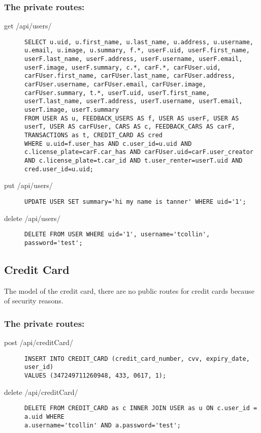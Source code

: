 \documentclass{article}
\begin{document}
\subsubsection{The private routes:}
\begin{description}
\item[get /api/users/] \mbox{}
\begin{lstlisting}[style=sql]
SELECT u.uid, u.first_name, u.last_name, u.address, u.username, u.email, u.image, u.summary, f.*, userF.uid, userF.first_name, userF.last_name, userF.address, userF.username, userF.email, userF.image, userF.summary, c.*, carF.*, carFUser.uid, carFUser.first_name, carFUser.last_name, carFUser.address, carFUser.username, carFUser.email, carFUser.image, carFUser.summary, t.*, userT.uid, userT.first_name, userT.last_name, userT.address, userT.username, userT.email, userT.image, userT.summary
FROM USER AS u, FEEDBACK_USERS AS f, USER AS userF, USER AS userT, USER AS carFUser, CARS AS c, FEEDBACK_CARS AS carF, TRANSACTIONS as t, CREDIT_CARD AS cred
WHERE u.uid=f.user_has AND c.user_id=u.uid AND c.license_plate=carF.car_has AND carFUser.uid=carF.user_creator AND c.license_plate=t.car_id AND t.user_renter=userT.uid AND cred.user_id=u.uid;
\end{lstlisting}

\item[put /api/users/] \mbox{}
\begin{lstlisting}[style=sql]
UPDATE USER SET summary='hi my name is tanner' WHERE uid='1';
\end{lstlisting}

\item[delete /api/users/] \mbox{}
\begin{lstlisting}[style=sql]
DELETE FROM USER WHERE uid='1', username='tcollin', password='test';
\end{lstlisting}
\end{description}

\subsection{Credit Card}
The model of the credit card, there are no public routes for credit cards because of security reasons.

\subsubsection{The private routes:}
\begin{description}
\item[post /api/creditCard/] \mbox{}
\begin{lstlisting}[style=sql]
INSERT INTO CREDIT_CARD (credit_card_number, cvv, expiry_date, user_id)
VALUES (347249711260948, 433, 0617, 1);
\end{lstlisting}

\item[delete /api/creditCard/] \mbox{}
\begin{lstlisting}[style=sql]
DELETE FROM CREDIT_CARD as c INNER JOIN USER as u ON c.user_id = a.uid WHERE
a.username='tcollin' AND a.password='test';
\end{lstlisting}
\end{description}
\end{document}

